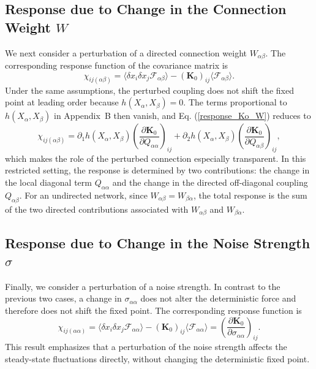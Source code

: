 \subsection{Response due to Change in the Connection Weight $W$}
\quad We next consider a perturbation of a directed connection weight $W_{\alpha\beta}$. The corresponding response function of the covariance matrix is
\begin{equation}
    \chi_{ij(\alpha\beta)} = \langle \delta x_i \delta x_j \mathscr{F}_{\alpha\beta} \rangle - (\mathbf{K}_0)_{ij} \langle \mathscr{F}_{\alpha\beta} \rangle.
    \label{response_Ko_W}
\end{equation}
Under the same assumptions, the perturbed coupling does not shift the fixed point at leading order because $h(X_\alpha, X_\beta)=0$. The terms proportional to $h(X_\alpha,X_\beta)$ in Appendix~B then vanish, and Eq. (\ref{response_Ko_W}) reduces to
\begin{equation}
    \chi_{ij(\alpha\beta)} = \partial_1 h(X_\alpha,X_\beta) \left( \frac{\partial \mathbf{K}_0}{\partial Q_{\alpha\alpha}} \right)_{ij} + \partial_2 h(X_\alpha,X_\beta) \left( \frac{\partial \mathbf{K}_0}{\partial Q_{\alpha\beta}} \right)_{ij},
    \label{chiKodW_ss}
\end{equation}
which makes the role of the perturbed connection especially transparent. In this restricted setting, the response is determined by two contributions: the change in the local diagonal term $Q_{\alpha\alpha}$ and the change in the directed off-diagonal coupling $Q_{\alpha\beta}$. For an undirected network, since $W_{\alpha\beta}=W_{\beta\alpha}$, the total response is the sum of the two directed contributions associated with $W_{\alpha\beta}$ and $W_{\beta\alpha}$.
\subsection{Response due to Change in the Noise Strength $\sigma$}
\quad Finally, we consider a perturbation of a noise strength. In contrast to the previous two cases, a change in $\sigma_{\alpha\alpha}$ does not alter the deterministic force and therefore does not shift the fixed point. The corresponding response function is
\begin{equation}
    \chi_{ij(\alpha\alpha)} = \langle \delta x_i \delta x_j \mathscr{F}_{\alpha\alpha} \rangle - (\mathbf{K}_0)_{ij} \langle \mathscr{F}_{\alpha\alpha} \rangle = \left( \frac{\partial \mathbf{K}_0}{\partial \sigma_{\alpha\alpha}} \right)_{ij}.
\end{equation}
This result emphasizes that a perturbation of the noise strength affects the steady-state fluctuations directly, without changing the deterministic fixed point.

